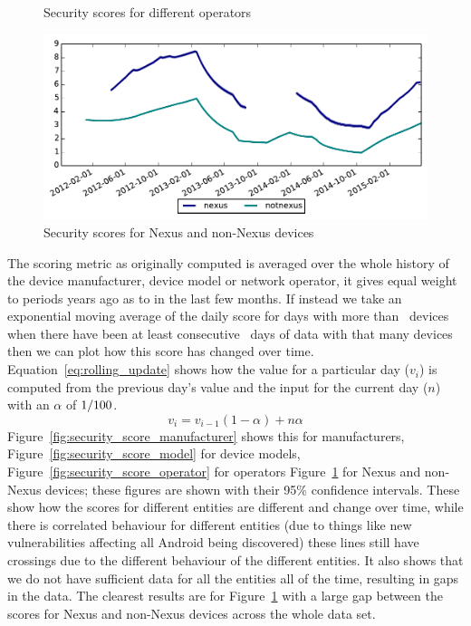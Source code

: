\begin{figure}
\caption{Security scores for different operators}
\label{fig:security_score_operator}
\includegraphics[width=\columnwidth]{figures/security_score_summary}
\caption{Security scores for Nexus and non-Nexus devices}
\label{fig:security_score_summary}
\end{figure}
The scoring metric as originally computed is averaged over the whole history of the device manufacturer, device model or network operator, it gives equal weight to periods years ago as to in the last few months.
If instead we take an exponential moving average of the daily score for days with more than \daSigNumDevicesDay\ devices when there have been at least consecutive \daSigNumDays\ days of data with that many devices then we can plot how this score has changed over time.
Equation~\ref{eq:rolling_update} shows how the value for a particular day ($v_i$) is computed from the previous day's value and the input for the current day ($n$) with an $\alpha$ of $1/100$.
\begin{equation}
v_i = v_{i-1} (1 - \alpha) + n \alpha
\label{eq:rolling_update}
\end{equation}
Figure~\ref{fig:security_score_manufacturer} shows this for manufacturers, Figure~\ref{fig:security_score_model} for device models, Figure~\ref{fig:security_score_operator} for operators Figure~\ref{fig:security_score_summary} for Nexus and non-Nexus devices; these figures are shown with their 95\% confidence intervals.
These show how the scores for different entities are different and change over time, while there is correlated behaviour for different entities (due to things like new vulnerabilities affecting all Android being discovered) these lines still have crossings due to the different behaviour of the different entities.
It also shows that we do not have sufficient data for all the entities all of the time, resulting in gaps in the data.
The clearest results are for Figure~\ref{fig:security_score_summary} with a large gap between the scores for Nexus and non-Nexus devices across the whole data set.


